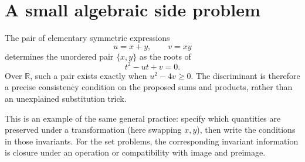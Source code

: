 \section{A small algebraic side problem}

The pair of elementary symmetric expressions
\[
 u=x+y,\qquad v=xy
\]
determines the unordered pair \(\{x,y\}\) as the roots of
\[
 t^2-ut+v=0.
\]
Over \(\mathbb R\), such a pair exists exactly when \(u^2-4v\ge0\). The discriminant is therefore a precise consistency condition on the proposed sums and products, rather than an unexplained substitution trick.

This is an example of the same general practice: specify which quantities are preserved under a transformation (here swapping \(x,y\)), then write the conditions in those invariants. For the set problems, the corresponding invariant information is closure under an operation or compatibility with image and preimage.
